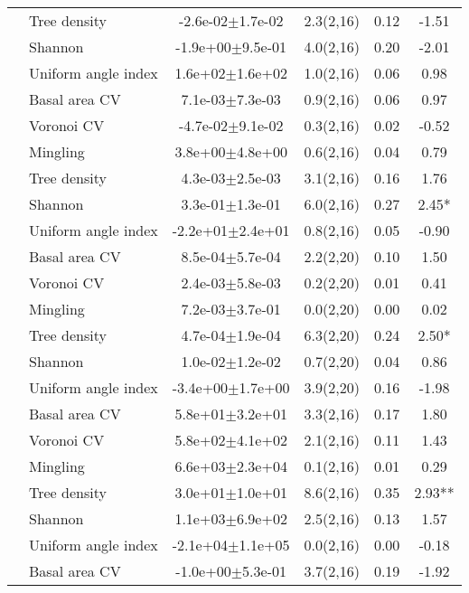 \begin{table}[]
\begin{tabular}{llcccS[table-format=-2.2, table-space-text-post = {***}]}
   & Tree density & -2.6e-02$\pm$1.7e-02 & 2.3(2,16) & 0.12 & -1.51 \\ 
   & Shannon & -1.9e+00$\pm$9.5e-01 & 4.0(2,16) & 0.20 & -2.01 \\ 
   & Uniform angle index &  1.6e+02$\pm$1.6e+02 & 1.0(2,16) & 0.06 & 0.98 \\ 
   \midrule
{} & Basal area CV &  7.1e-03$\pm$7.3e-03 & 0.9(2,16) & 0.06 & 0.97 \\ 
   & Voronoi CV & -4.7e-02$\pm$9.1e-02 & 0.3(2,16) & 0.02 & -0.52 \\ 
   & Mingling &  3.8e+00$\pm$4.8e+00 & 0.6(2,16) & 0.04 & 0.79 \\ 
   & Tree density &  4.3e-03$\pm$2.5e-03 & 3.1(2,16) & 0.16 & 1.76 \\ 
   & Shannon &  3.3e-01$\pm$1.3e-01 & 6.0(2,16) & 0.27 & 2.45* \\ 
   & Uniform angle index & -2.2e+01$\pm$2.4e+01 & 0.8(2,16) & 0.05 & -0.90 \\ 
   \midrule
{} & Basal area CV &  8.5e-04$\pm$5.7e-04 & 2.2(2,20) & 0.10 & 1.50 \\ 
   & Voronoi CV &  2.4e-03$\pm$5.8e-03 & 0.2(2,20) & 0.01 & 0.41 \\ 
   & Mingling &  7.2e-03$\pm$3.7e-01 & 0.0(2,20) & 0.00 & 0.02 \\ 
   & Tree density &  4.7e-04$\pm$1.9e-04 & 6.3(2,20) & 0.24 & 2.50* \\ 
   & Shannon &  1.0e-02$\pm$1.2e-02 & 0.7(2,20) & 0.04 & 0.86 \\ 
   & Uniform angle index & -3.4e+00$\pm$1.7e+00 & 3.9(2,20) & 0.16 & -1.98 \\ 
   \midrule
{} & Basal area CV &  5.8e+01$\pm$3.2e+01 & 3.3(2,16) & 0.17 & 1.80 \\ 
   & Voronoi CV &  5.8e+02$\pm$4.1e+02 & 2.1(2,16) & 0.11 & 1.43 \\ 
   & Mingling &  6.6e+03$\pm$2.3e+04 & 0.1(2,16) & 0.01 & 0.29 \\ 
   & Tree density &  3.0e+01$\pm$1.0e+01 & 8.6(2,16) & 0.35 & 2.93** \\ 
   & Shannon &  1.1e+03$\pm$6.9e+02 & 2.5(2,16) & 0.13 & 1.57 \\ 
   & Uniform angle index & -2.1e+04$\pm$1.1e+05 & 0.0(2,16) & 0.00 & -0.18 \\ 
   \midrule
{} & Basal area CV & -1.0e+00$\pm$5.3e-01 & 3.7(2,16) & 0.19 & -1.92 \\ 

\end{tabular}
\end{table}
